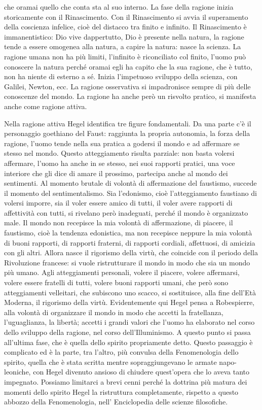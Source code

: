 \documentclass[a4paper,12pt,oneside,openany]{book}%
\begin{document}
che oramai quello che conta sta al suo interno. La fase della ragione inizia storicamente con il Rinascimento. Con il Rinascimento si avvia il superamento della coscienza infelice, cioè del distacco tra finito e infinito. Il Rinascimento è immanentistico: Dio vive dappertutto, Dio è presente nella natura, la ragione tende a essere omogenea alla natura, a capire la natura: nasce la scienza. La ragione umana non ha più limiti, l’infinito è riconciliato col finito, l’uomo può conoscere la natura perché oramai egli ha capito che la sua ragione, che è tutto, non ha niente di esterno a sé. Inizia l’impetuoso sviluppo della scienza, con Galilei, Newton, ecc. La ragione osservativa si impadronisce sempre di più delle conoscenze del mondo. La ragione ha anche però un risvolto pratico, si manifesta anche come ragione attiva.

Nella ragione attiva Hegel identifica tre figure fondamentali. Da una parte c’è il personaggio goethiano del Faust: raggiunta la propria autonomia, la forza della ragione, l’uomo tende nella sua pratica a godersi il mondo e ad affermare se stesso nel mondo. Questo atteggiamento risulta parziale: non basta volersi affermare, l’uomo ha anche in se stesso, nei suoi rapporti pratici, una voce interiore che gli dice di amare il prossimo, partecipa anche al mondo dei sentimenti. Al momento brutale di volontà di affermazione del faustismo, succede il momento del sentimentalismo. Sia l’edonismo, cioè l’atteggiamento faustiano di volersi imporre, sia il voler essere amico di tutti, il voler avere rapporti di affettività con tutti, si rivelano però inadeguati, perché il mondo è organizzato male. Il mondo non recepisce la mia volontà di affermazione, di piacere, il faustismo, cioè la tendenza edonistica, ma non recepisce neppure la mia volontà di buoni rapporti, di rapporti fraterni, di rapporti cordiali, affettuosi, di amicizia con gli altri. Allora nasce il rigorismo della virtù, che coincide con il periodo della Rivoluzione francese: si vuole ristrutturare il mondo in modo che sia un mondo più umano. Agli atteggiamenti personali, volere il piacere, volere affermarsi, volere essere fratelli di tutti, volere buoni rapporti umani, che però sono atteggiamenti velleitari, che subiscono uno scacco, si sostituisce, alla fine dell’Età Moderna, il rigorismo della virtù. Evidentemente qui Hegel pensa a Robespierre, alla volontà di organizzare il mondo in modo che accetti la fratellanza, l’uguaglianza, la libertà; accetti i grandi valori che l’uomo ha elaborato nel corso dello sviluppo della ragione, nel corso dell’Illuminismo. A questo punto si passa all’ultima fase, che è quella dello spirito propriamente detto. Questo passaggio è complicato ed è la parte, tra l’altro, più convulsa della Fenomenologia dello spirito, quella che è stata scritta mentre sopraggiungevano le armate napo-leoniche, con Hegel divenuto ansioso di chiudere quest’opera che lo aveva tanto impegnato. Possiamo limitarci a brevi cenni perché la dottrina più matura dei momenti dello spirito Hegel la ristruttura completamente, rispetto a questo abbozzo della Fenomenologia, nell’ Enciclopedia delle scienze filosofiche.
\end{document}
